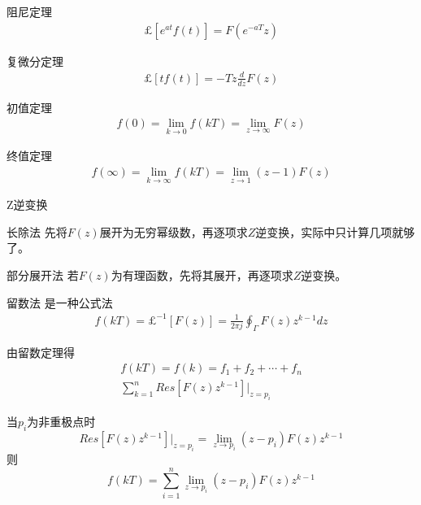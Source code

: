 \begin{frame}
\begin{block}{阻尼定理}
\begin{eqnarray*}
\pounds[e^{at}f(t)]=F(e^{-aT}z)
\end{eqnarray*}
\end{block}
\begin{block}{复微分定理}
\begin{eqnarray*}
\pounds[tf(t)]=-Tz\frac{d}{dz}F(z)
\end{eqnarray*}
\end{block}
\end{frame}

\begin{frame}
\begin{block}{初值定理}
\begin{eqnarray*}
f(0)=\lim_{k\to 0}f(kT)=\lim_{z\to\infty}F(z)
\end{eqnarray*}
\end{block}
\begin{block}{终值定理}
\begin{eqnarray*}
f(\infty)=\lim_{k\to\infty}f(kT)=\lim_{z\to 1}(z-1)F(z)
\end{eqnarray*}
\end{block}
\end{frame}

\begin{frame}{Z逆变换}
\begin{block}{长除法}
先将$F(z)$展开为无穷幂级数，再逐项求$Z$逆变换，实际中只计算几项就够了。
\end{block}
\begin{block}{部分展开法}
若$F(z)$为有理函数，先将其展开，再逐项求$Z$逆变换。
\end{block}
\end{frame}
\begin{frame}{}
\begin{block}{留数法}
是一种公式法
\begin{eqnarray*}
f(kT)=\pounds^{-1}[F(z)]=\frac{1}{2\pi j}\oint_{\Gamma}F(z)z^{k-1}dz
\end{eqnarray*}
\end{block}
\begin{block}{由留数定理得}
\begin{eqnarray*}
f(kT)=f(k)=f_1+f_2+\cdots +f_n\\
\sum\limits_{k=1}^nRes[F(z)z^{k-1}]|_{z=p_i}
\end{eqnarray*}
\end{block}
\end{frame}
\begin{frame}
\begin{block}{当$p_i$为非重极点时}
\[Res[F(z)z^{k-1}]|_{z=p_i}=\lim_{z\to p_i}(z-p_i)F(z)z^{k-1}\]
则
\[f(kT)=\sum\limits_{i=1}^n\lim_{z\to p_i}(z-p_i)F(z)z^{k-1}\]
\end{block}
\end{frame}

